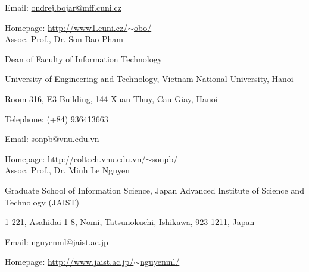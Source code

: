 \documentclass[9pt]{extreport}
\begin{document}
Email: \href{mailto:ondrej.bojar@mff.cuni.cz}{ondrej.bojar@mff.cuni.cz}

Homepage: \href{http://www1.cuni.cz/~obo/}{http://www1.cuni.cz/$\sim$obo/} \\
%

Assoc. Prof., Dr. Son Bao Pham 

Dean of Faculty of Information Technology

University of Engineering and Technology, Vietnam National University, Hanoi

Room 316, E3 Building, 144 Xuan Thuy, Cau Giay, Hanoi

Telephone: (+84) 936413663

Email: \href{mailto:sonpb@vnu.edu.vn}{sonpb@vnu.edu.vn}

Homepage: \href{http://coltech.vnu.edu.vn/\~sonpb/}{http://coltech.vnu.edu.vn/$\sim$sonpb/} \\ 

%
Assoc. Prof., Dr. Minh Le Nguyen	

Graduate School of Information Science, Japan Advanced Institute of Science and Technology (JAIST) 

1-221, Asahidai 1-8, Nomi, Tatsunokuchi, Ishikawa, 923-1211, Japan

Email: \href{mailto:nguyenml@jaist.ac.jp}{nguyenml@jaist.ac.jp}

Homepage: \href{http://www.jaist.ac.jp/\~nguyenml/}{http://www.jaist.ac.jp/$\sim$nguyenml/}
\bigskip




\end{document}
